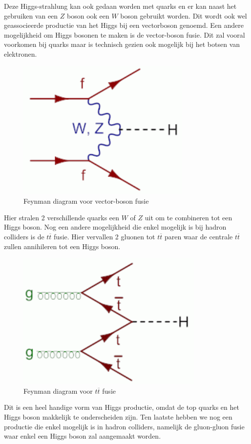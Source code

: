 \documentclass[../main.tex]{subfiles}
\begin{document}
Deze Higgs-strahlung kan ook gedaan worden met quarks en er kan naast het gebruiken van een $Z$ boson ook een $W$ boson gebruikt worden. Dit wordt ook wel geassocieerde productie van het Higgs bij een vectorboson genoemd. Een andere mogelijkheid om Higgs bosonen te maken is de vector-boson fusie. Dit zal vooral voorkomen bij quarks maar is technisch gezien ook mogelijk bij het botsen van elektronen.

\begin{figure}[h]
    \centering
    \includegraphics[width=0.5\linewidth]{higgs_boson/vec_bos_fusie.png}
    \caption{Feynman diagram voor vector-boson fusie}%
    \label{fig:higgs_boson/vec_bos_fusie}
\end{figure}

Hier stralen 2 verschillende quarks een $W$ of $Z$ uit om te combineren tot een Higgs boson. Nog een andere mogelijkheid die enkel mogelijk is bij hadron colliders is de $t\overline t$ fusie. Hier vervallen 2 gluonen tot $t\overline t$ paren waar de centrale $t\overline t$ zullen annihileren tot een Higgs boson.

\begin{figure}[h]
    \centering
    \includegraphics[width=0.5\linewidth]{higgs_boson/tt_fusie.png}
    \caption{Feynman diagram voor $t\overline t$ fusie}%
    \label{fig:higgs_boson/tt_fusie}
\end{figure}

Dit is een heel handige vorm van Higgs productie, omdat de top quarks en het Higgs boson makkelijk te onderscheiden zijn. Ten laatste hebben we nog een productie die enkel mogelijk is in hadron colliders, namelijk de gluon-gluon fusie waar enkel een Higgs boson zal aangemaakt worden.
\end{document}
